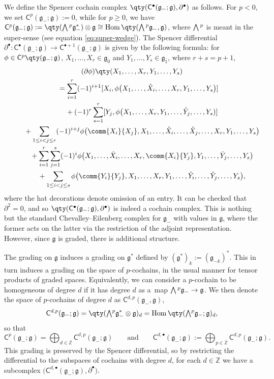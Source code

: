 \documentclass[pdftex]{sigma}
\numberwithin{equation}{section}
\newcommand{\fg}{\mathfrak{g}}
\newcommand{\ZZ}{\mathbb{Z}}
\newcommand{\ssC}{\mathsf{C}}
\newcommand{\Wedge}{\mathchoice{{\textstyle\bigwedge}}{\bigwedge}{\bigwedge}{\bigwedge}}	%
\newcommand{\1}{\mathbbm{1}}
\DeclareMathOperator{\Hom}{Hom}
\begin{document}
We define the Spencer cochain complex $\qty(\ssC^\bullet(\fg_-;\fg),\partial^\bullet)$ as follows. For $p<0$, we set $\ssC^p(\fg_-;\fg)\allowbreak:=0$, while for $p\geq 0$, we have
$\ssC^p(\fg_-;\fg) := \qty(\Wedge^p \fg_-^*) \otimes \fg \cong \Hom\qty(\Wedge^p \fg_-,\fg)$,
where $\Wedge^p$ is meant in the super-sense (see equation \eqref{eq:super-wedge}). The Spencer differential $\partial^\bullet\colon \ssC^\bullet(\fg_-;\fg)\to \ssC^{\bullet+1}(\fg_-;\fg)$ is given by the following formula: for $\phi\in \ssC^p\qty(\fg_-;\fg)$, $X_1,\dots, X_r\in\fg_{\overline{0}}$ and $Y_1,\dots,Y_s\in\fg_{\overline{1}}$, where $r+s=p+1$,
\begin{gather}
	(\partial\phi)\qty(X_1,\dots,X_r,Y_1,\dots,Y_s)\nonumber\\
\qquad	= \sum_{i=1}^r (-1)^{i+1} [X_i,\phi\bigl(X_1,\dots,\hat{X}_i,\dots,X_r,Y_1,\dots,Y_s\bigr)]	\nonumber\\
\phantom{\qquad=}{}+ (-1)^{r} \sum_{s=1}^r [Y_j,\phi \bigl(X_1,\dots,X_r,Y_1,\dots,\hat{Y}_j,\dots,Y_s)]\nonumber	\\
\phantom{\qquad=}{}+ \sum_{1\leq i<j\leq r} (-1)^{i+j} \phi \bigl(\comm{X_i}{X_j},X_1,\dots,\hat{X}_i,\dots,\hat{X}_j,\dots,X_r,Y_1,\dots,Y_s\bigr)\nonumber	\\
\phantom{\qquad=}{}+ \sum_{i=1}^r\sum_{j=1}^s (-1)^{i} \phi \bigl(X_1,\dots,\hat{X}_i,\dots,X_r,\comm{X_i}{Y_j},Y_1,\dots,\hat{Y}_j,\dots,Y_s\bigr)	\nonumber\\
\phantom{\qquad=}{}+ \sum_{1\leq i<j\leq s} \phi \bigl(\comm{Y_i}{Y_j},X_1,\dots,X_r,Y_1,\dots,\hat{Y}_i,\dots,\hat{Y}_j,\dots,Y_s\bigr),\label{eq:CEdiffLiesuper}
\end{gather}
where the hat decorations denote omission of an entry. It can be checked that $\partial^2=0$, and so $\qty(\ssC^\bullet(\fg_-;\fg),\partial^\bullet)$ is indeed a cochain complex. This is nothing but the standard Chevalley--Eilenberg complex for $\fg_-$ with values in $\fg$, where the former acts on the latter via the restriction of the adjoint representation. However, since $\fg$ is graded, there is additional structure.

The grading on $\fg$ induces a grading on $\fg^*$ defined by $(\fg^*)_k:=(\fg_{-k})^*$. This in turn induces a grading on the space of $p$-cochains, in the usual manner for tensor products of graded spaces. Equivalently, we can consider a $p$-cochain to be homogeneous of degree $d$ if it has degree $d$ as a~map $\Wedge^p \fg_-\to\fg$. We then denote the space of $p$-cochains of degree $d$ as $\ssC^{d,p}(\fg_-,\fg)$,
\begin{equation}\label{eq:spencer-complex-grading}
	\ssC^{d,p}(\fg_-;\fg) = \qty(\Wedge^p \fg_-^*\otimes \fg)_d = \Hom\qty(\Wedge^p \fg_-;\fg)_d,
\end{equation}
so that
\[
	\ssC^p(\fg_-;\fg) = \bigoplus_{d\in\ZZ} \ssC^{d,p}(\fg_-;\fg) \qquad\text{and} \qquad\ssC^{d,\bullet}(\fg_-;\fg) := \bigoplus_{p\in\ZZ} \ssC^{d,p}(\fg_-;\fg).
\]
This grading is preserved by the Spencer differential, so by restricting the differential to the subspaces of cochains with degree $d$, for each $d\in\ZZ$ we have a subcomplex $\bigl(\ssC^{d,\bullet}(\fg_-;\fg),\partial^\bullet\bigr)$.
\end{document}

